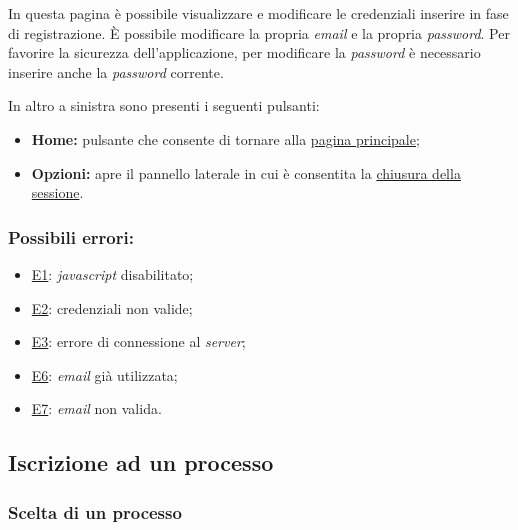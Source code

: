In questa pagina è possibile visualizzare e modificare le credenziali inserire in fase di registrazione.
È possibile modificare la propria \textit{email} e la propria \textit{password}.
Per favorire la sicurezza dell'applicazione, per modificare la \textit{password} è necessario inserire anche la \textit{password} corrente.

In altro a sinistra sono presenti i seguenti pulsanti:
\begin{itemize}
\item \textbf{Home:} pulsante che consente di tornare alla \hyperref[home]{pagina principale};
\item \textbf{Opzioni:} apre il pannello laterale in cui è consentita la \hyperref[logout]{chiusura della sessione}.
\end{itemize}

\subsubsection*{Possibili errori:}
\begin{itemize}
\item \hyperref[e1]{E1}: \textit{javascript} disabilitato;
\item \hyperref[e2]{E2}: credenziali non valide;
\item \hyperref[e3]{E3}: errore di connessione al \textit{server};
\item \hyperref[e6]{E6}: \textit{email} già utilizzata;
\item \hyperref[e7]{E7}: \textit{email} non valida.
\end{itemize}

\subsection{Iscrizione ad un processo}
\label{iscrizione}

\subsubsection{Scelta di un processo}

